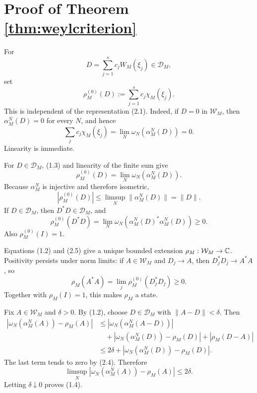 \documentclass[11pt,a4paper]{article}
\newcommand{\W}{\mathcal W}
\begin{document}
\section{Proof of Theorem \ref{thm:weylcriterion}}


For
\[
 D=\sum_{j=1}^s c_jW_M(\xi_j)\in\mathcal D_M,                  \tag{2.1}
\]
set
\[
 \rho_M^{(0)}(D):=\sum_{j=1}^sc_j\chi_M(\xi_j).                \tag{2.2}
\]
This is independent of the representation (2.1).  Indeed, if \(D=0\) in
\(\W_M\), then \(\alpha_M^N(D)=0\) for every \(N\), and hence
\[
 \sum_jc_j\chi_M(\xi_j)
 =\lim_N\omega_N(\alpha_M^N(D))=0.                             \tag{2.3}
\]
Linearity is immediate.


For \(D\in\mathcal D_M\), (1.3) and linearity of the finite sum give
\[
 \rho_M^{(0)}(D)=\lim_N\omega_N(\alpha_M^N(D)).                 \tag{2.4}
\]
Because \(\alpha_M^N\) is injective and therefore isometric,
\[
 |\rho_M^{(0)}(D)|
 \le\limsup_N\|\alpha_M^N(D)\|=\|D\|.                          \tag{2.5}
\]
If \(D\in\mathcal D_M\), then \(D^*D\in\mathcal D_M\), and
\[
 \rho_M^{(0)}(D^*D)
 =\lim_N\omega_N(\alpha_M^N(D)^*\alpha_M^N(D))\ge0.            \tag{2.6}
\]
Also \(\rho_M^{(0)}(I)=1\).


Equations (1.2) and (2.5) give a unique bounded extension
\(\rho_M:\W_M\to\C\).  Positivity persists under norm limits: if
\(A\in\W_M\) and \(D_j\to A\), then \(D_j^*D_j\to A^*A\), so
\[
 \rho_M(A^*A)=\lim_j\rho_M^{(0)}(D_j^*D_j)\ge0.                \tag{2.7}
\]
Together with \(\rho_M(I)=1\), this makes \(\rho_M\) a state.


Fix \(A\in\W_M\) and \(\delta>0\).  By (1.2), choose
\(D\in\mathcal D_M\) with \(\|A-D\|<\delta\).  Then
\begin{align}
 |\omega_N(\alpha_M^N(A))-\rho_M(A)|
 &\le|\omega_N(\alpha_M^N(A-D))|\\
 &\quad+|\omega_N(\alpha_M^N(D))-\rho_M(D)|
       +|\rho_M(D-A)|\\
 &\le2\delta+
 |\omega_N(\alpha_M^N(D))-\rho_M(D)|.                          \tag{2.8}
\end{align}
The last term tends to zero by (2.4).  Therefore
\[
 \limsup_N|\omega_N(\alpha_M^N(A))-\rho_M(A)|\le2\delta.       \tag{2.9}
\]
Letting \(\delta\downarrow0\) proves (1.4).
\end{document}
